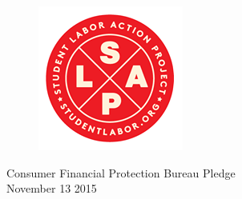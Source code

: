 \documentclass{article}
\begin{document}
\begin{figure}

\vspace*{-1.8cm}
\hspace*{-1.5cm}
\includegraphics[scale=0.5]{SLAP}

\end{figure}

\LARGE \hspace*{-0.75cm} Consumer Financial Protection Bureau Pledge \\
\normalsize November 13 2015


\doublespacing
\normalsize
\end{document}
